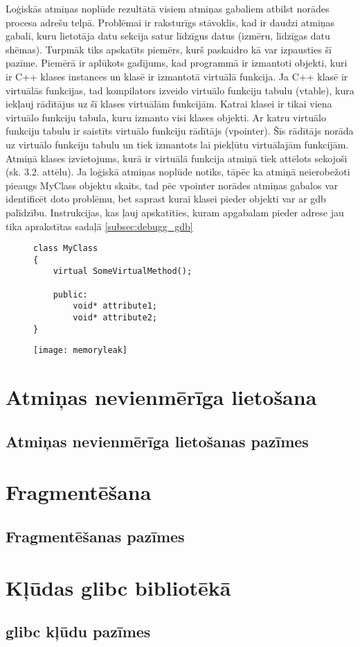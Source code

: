 Loģiskās atmiņas noplūde rezultātā visiem atmiņas gabaliem atbilst norādes procesa adrešu telpā. 
Problēmai ir raksturīgs stāvoklis, kad ir daudzi atmiņas gabali, kuru lietotāja datu sekcija satur līdzīgus datus (izmēru, līdzīgas datu shēmas).
Turpmāk tiks apskatīts piemērs, kurš paskaidro kā var izpausties šī pazīme.
Piemērā ir aplūkots gadījums, kad programmā ir izmantoti objekti, kuri ir  C++ klases instances un klasē ir izmantotā virtuālā funkcija.
Ja C++ klasē ir virtuālās funkcijas, tad kompilators izveido virtuālo funkciju tabulu (vtable), kura iekļauj rādītājus uz šī klases virtuālām funkcijām.
 Katrai klasei ir tikai viena virtuālo funkciju tabula, kuru izmanto visi klases objekti.
 Ar katru virtuālo funkciju tabulu ir saistīts virtuālo funkciju rādītājs (vpointer).
 Šīs rādītājs norāda uz virtuālo funkciju tabulu un tiek izmantots lai piekļūtu virtuālajām funkcijām.
Atmiņā klases izvietojums, kurā ir virtuālā funkcija atmiņā tiek attēlots sekojoši (sk. 3.2. attēlu).
Ja loģiskā atmiņas noplūde notiks, tāpēc ka atmiņā neierobežoti pieaugs MyClass objektu skaits, tad pēc vpointer norādes atmiņas gabalos var identificēt doto problēmu, bet saprast kurai klasei pieder objekti var ar gdb palīdzību.
Instrukcijas, kas ļauj apskatīties, kuram apgabalam pieder adrese jau tika aprakstītas sadaļā \ref{subsec:debugg_gdb}
\begin{figure}[h]
\begin{lstlisting}
class MyClass
{
    virtual SomeVirtualMethod();
    
    public:
        void* attribute1;
        void* attribute2;
}
\end{lstlisting}
\end{figure}
\begin{figure}[h]
\begin{center}
\texttt{[image: memoryleak]}
\end{center}
\caption{\textbf{\fontsize{11}{12}\selectfont {C++ klases ar virtuālo funkciju izvietojums atmiņā }}}
\label{fig:memoryleak}
\end{figure}



\section{Atmiņas nevienmērīga lietošana}
\subsection{Atmiņas nevienmērīga lietošanas pazīmes}

\section{Fragmentēšana}
\subsection{Fragmentēšanas pazīmes}

\section{Kļūdas glibc bibliotēkā}
\subsection{glibc kļūdu pazīmes}
